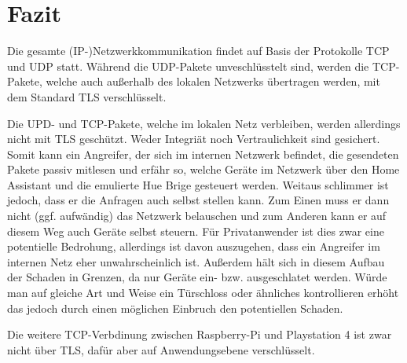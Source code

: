 \newpage
\section{Fazit}\label{sec:fazit}

Die gesamte (IP-)Netzwerkkommunikation findet auf Basis der Protokolle TCP und UDP statt.
Während die UDP-Pakete unveschlüsstelt sind,
werden die TCP-Pakete, welche auch außerhalb des lokalen Netzwerks übertragen werden,
mit dem Standard TLS verschlüsselt.

Die UPD- und TCP-Pakete, welche im lokalen Netz verbleiben, werden allerdings nicht mit TLS geschützt.
Weder Integriät noch Vertraulichkeit sind gesichert.
Somit kann ein Angreifer, der sich im internen Netzwerk befindet,
die gesendeten Pakete passiv mitlesen und erfähr so,
welche Geräte im Netzwerk über den Home Assistant und die emulierte Hue Brige gesteuert werden.
Weitaus schlimmer ist jedoch, dass er die Anfragen auch selbst stellen kann.
Zum Einen muss er dann nicht (ggf. aufwändig) das Netzwerk belauschen
und zum Anderen kann er auf diesem Weg auch Geräte selbst steuern.
Für Privatanwender ist dies zwar eine potentielle Bedrohung,
allerdings ist davon auszugehen, dass ein Angreifer im internen Netz eher unwahrscheinlich ist.
Außerdem hält sich in diesem Aufbau der Schaden in Grenzen, da nur Geräte ein- bzw. ausgeschlatet werden.
Würde man auf gleiche Art und Weise ein Türschloss oder ähnliches kontrollieren erhöht das jedoch durch einen
möglichen Einbruch den potentiellen Schaden.

Die weitere TCP-Verbdinung zwischen Raspberry-Pi und Playstation 4 ist zwar nicht über TLS,
dafür aber auf Anwendungsebene verschlüsselt.
